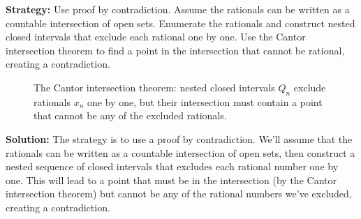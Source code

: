 \noindent\textbf{Strategy:} Use proof by contradiction. Assume the rationals can be written as a countable intersection of open sets. Enumerate the rationals and construct nested closed intervals that exclude each rational one by one. Use the Cantor intersection theorem to find a point in the intersection that cannot be rational, creating a contradiction.

\begin{figure}[h]
\centering
{}
\caption{The Cantor intersection theorem: nested closed intervals $Q_n$ exclude rationals $x_n$ one by one, but their intersection must contain a point that cannot be any of the excluded rationals.}
\end{figure}

\bigskip\noindent\textbf{Solution:} The strategy is to use a proof by contradiction. We'll assume that the rationals can be written as a countable intersection of open sets, then construct a nested sequence of closed intervals that excludes each rational number one by one. This will lead to a point that must be in the intersection (by the Cantor intersection theorem) but cannot be any of the rational numbers we've excluded, creating a contradiction.

